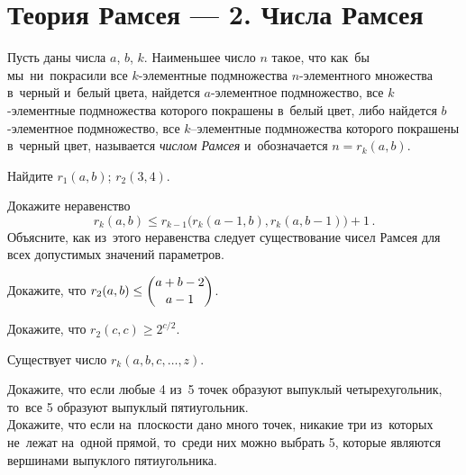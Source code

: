 
\section*{Теория Рамсея --- 2. Числа Рамсея}


Пусть даны числа $a$, $b$, $k$.
Наименьшее число $n$ такое, что как~бы мы~ни~покрасили все
$k$-элементные подмножества $n$-элементного множества в~черный и~белый цвета,
найдется $a$-элементное подмножество, все $k$-элементные подмножества
которого покрашены в~белый цвет, либо найдется $b$-элементное подмножество,
все $k$--элементные подмножества которого покрашены в~черный цвет, называется
\emph{числом Рамсея} и~обозначается $n = r_k(a, b)$.

\begin{problems}

\item
Найдите
\quad
\sp $r_1(a, b)$;
\quad
\sp $r_2(3, 4)$.

\item
Докажите неравенство
\[
    r_{k}(a, b)
\leq
    r_{k-1} \bigl( r_{k}(a - 1, b), r_k(a, b - 1) \bigr) + 1
\,.\]
Объясните, как из~этого неравенства следует существование чисел Рамсея для всех
допустимых значений параметров. 

\item
Докажите, что
\(
    r_2(a, b) \leq \dbinom{a + b - 2}{a - 1}
\)\;. 

\item
Докажите, что $r_2(c, c) \geq 2^{c / 2}$. 

\item{}
Существует число $r_k(a, b, c, \ldots, z)$.  


\item{}
\sp
Докажите, что если любые 4 из~5 точек образуют выпуклый четырехугольник,
то~все 5 образуют выпуклый пятиугольник.
\\
\sp
Докажите, что если на~плоскости дано много точек, никакие три из~которых
не~лежат на~одной прямой, то~среди них можно выбрать 5, которые являются
вершинами выпуклого пятиугольника.

\end{problems}

